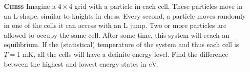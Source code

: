 \begin{problem}{\textbf{\textsc{Chess}}}
Imagine a $4 \times 4$ grid with a particle in each cell. These particles move in an L-shape, similar to knights in chess. Every second, a particle moves randomly in one of the cells it can access with an L jump. Two or more particles are allowed to occupy the same cell. After some time, this system will reach an equilibrium. If the (statistical) temperature of the system and thus each cell is $T=1\; \mathrm{mK}$, all the cells will have a definite energy level. Find the difference between the highest and lowest energy states in $\mathrm{eV}$.







\end{problem}